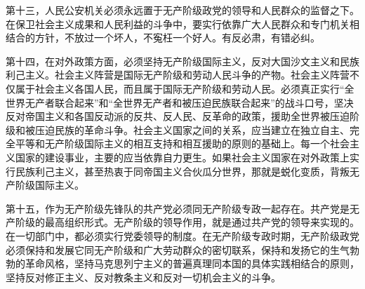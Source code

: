 第十三，人民公安机关必须永远置于无产阶级政党的领导和人民群众的监督之下。在保卫社会主义成果和人民利益的斗争中，要实行依靠广大人民群众和专门机关相结合的方针，不放过一个坏人，不寃枉一个好人。有反必肃，有错必纠。

第十四，在对外政策方面，必须坚持无产阶级国际主义，反对大国沙文主义和民族利己主义。社会主义阵营是国际无产阶级和劳动人民斗争的产物。社会主义阵营不仅属于社会主义各国人民，而且属于国际无产阶级和劳动人民。必须真正实行“全世界无产者联合起来”和“全世界无产者和被压迫民族联合起来”的战斗口号，坚决反对帝国主义和各国反动派的反共、反人民、反革命的政策，援助全世界被压迫阶级和被压迫民族的革命斗争。社会主义国家之间的关系，应当建立在独立自主、完全平等和无产阶级国际主义的相互支持和相互援助的原则的基础上。每一个社会主义国家的建设事业，主要的应当依靠自力更生。如果社会主义国家在对外政策上实行民族利己主义，甚至热衷于同帝国主义合伙瓜分世界，那就是蜕化变质，背叛无产阶级国际主义。

第十五，作为无产阶级先锋队的共产党必须同无产阶级专政一起存在。共产党是无产阶级的最高组织形式。无产阶级的领导作用，就是通过共产党的领导来实现的。在一切部门中，都必须实行党委领导的制度。在无产阶级专政时期，无产阶级政党必须保持和发展它同无产阶级和广大劳动群众的密切联系，保持和发扬它的生气勃勃的革命风格，坚持马克思列宁主义的普遍真理同本国的具体实践相结合的原则，坚持反对修正主义、反对教条主义和反对一切机会主义的斗争。


